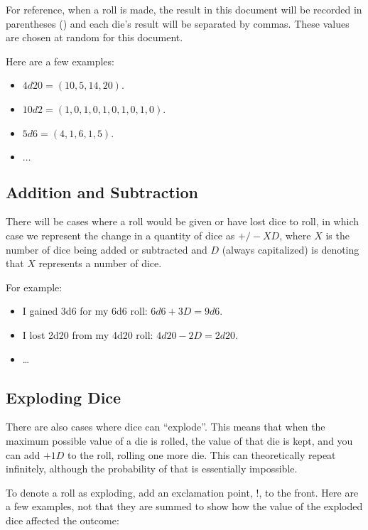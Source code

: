 \documentclass[../main.tex]{subfiles}
\begin{document}
    For reference, when a roll is made, the result in this document will be recorded in parentheses () and each die's result will be separated by commas. These values are chosen at random for this document.

    Here are a few examples:

    \begin{itemize}
        \item $4d20 = (10, 5, 14, 20)$.
        \item $10d2 = (1, 0, 1, 0, 1, 0, 1, 0, 1, 0)$.
        \item $5d6 = (4, 1, 6, 1, 5)$.
        \item $\dots$
    \end{itemize}

    \subsection{Addition and Subtraction}

    There will be cases where a roll would be given or have lost dice to roll, in which case we represent the change in a quantity of dice as $+/-XD$, where $X$ is the number of dice being added or subtracted and $D$ (always capitalized) is denoting that $X$ represents a number of dice.

    For example:
    \begin{itemize}
        \item I gained 3d6 for my 6d6 roll: $6d6 + 3D = 9d6$.
        \item I lost 2d20 from my 4d20 roll: $4d20 - 2D = 2d20$.
        \item \dots
    \end{itemize}

    \subsection{Exploding Dice}

    There are also cases where dice can ``explode''. This means that when the maximum possible value of a die is rolled, the value of that die is kept, and you can add $+1D$ to the roll, rolling one more die. This can theoretically repeat infinitely, although the probability of that is essentially impossible.

    To denote a roll as exploding, add an exclamation point, $!$, to the front. Here are a few examples, not that they are summed to show how the value of the exploded dice affected the outcome:
\end{document}

